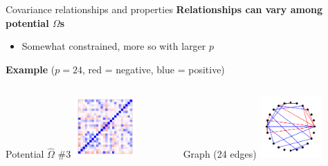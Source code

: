 \documentclass[professionalfonts]{beamer}
\begin{document}
\begin{frame}{Covariance relationships and properties}
\textbf{Relationships can vary among potential $\Omega$s}
\begin{itemize}
\item Somewhat constrained, more so with larger $p$
\end{itemize}
\textbf{Example} ($p = 24$, {\color{red} red} = negative, {\color{blue} blue} = positive)
\begin{columns}
\begin{column}{0.45\textwidth}
\begin{center}
Potential $\widehat{\Omega}$ \#3
\includegraphics[width=90px]{figs/example-alt3-cor.pdf}
\end{center}
\end{column}
\begin{column}{0.45\textwidth}
\begin{center}
Graph (24 edges)
\includegraphics[width=90px]{figs/example-alt3-graph.pdf}
\end{center}
\end{column}
\end{columns}
\end{frame}
\end{document}
